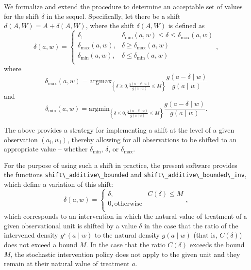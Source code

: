 \documentclass[
  12pt, krantz2,
]{krantz}
\newcommand{\passthrough}[1]{#1}
\theoremstyle{definition}
\theoremstyle{definition}
\theoremstyle{definition}
\newcommand{\1}{\mathbbm{1}}
\begin{document}
We formalize and extend the procedure to determine an acceptable set of values
for the shift \(\delta\) in the sequel. Specifically, let there be a shift \(d(A, W) = A + \delta(A, W)\), where the shift \(\delta(A, W)\) is defined as
\begin{equation}
  \delta(a, w) =
    \begin{cases}
      \delta, & \delta_{\text{min}}(a,w) \leq \delta \leq
        \delta_{\text{max}}(a,w) \\
      \delta_{\text{max}}(a,w), & \delta \geq \delta_{\text{max}}(a,w) \\
      \delta_{\text{min}}(a,w), & \delta \leq \delta_{\text{min}}(a,w) \\
    \end{cases},
\end{equation}
where \[\delta_{\text{max}}(a, w) = \text{argmax}_{\left\{\delta \geq 0,
\frac{g(a - \delta \mid w)}{g(a \mid w)} \leq M \right\}} \frac{g(a - \delta
\mid w)}{g(a \mid w)}\] and
\[\delta_{\text{min}}(a, w) = \text{argmin}_{\left\{\delta \leq 0,
\frac{g(a - \delta \mid w)}{g(a \mid w)} \leq M \right\}} \frac{g(a - \delta
\mid w)}{g(a \mid w)}.\]

The above provides a strategy for implementing a shift at the level of a given
observation \((a_i, w_i)\), thereby allowing for all observations to be shifted
to an appropriate value -- whether \(\delta_{\text{min}}\), \(\delta\), or
\(\delta_{\text{max}}\).

For the purpose of using such a shift in practice, the present software
provides the functions \passthrough{\lstinline!shift\_additive\_bounded!} and
\passthrough{\lstinline!shift\_additive\_bounded\_inv!}, which define a variation of this shift:
\begin{equation}
  \delta(a, w) =
    \begin{cases}
      \delta, & C(\delta) \leq M \\
      0, \text{otherwise} \\
    \end{cases},
  \label{eq:shift-simple}
\end{equation}
which corresponds to an intervention in which the natural value of treatment
of a given observational unit is shifted by a value \(\delta\) in the case that
the ratio of the intervened density \(g^{\star}(a \mid w)\) to the natural
density \(g(a \mid w)\) (that is, \(C(\delta)\)) does not exceed a bound \(M\). In
the case that the ratio \(C(\delta)\) exceeds the bound \(M\), the stochastic
intervention policy does not apply to the given unit and they remain at their
natural value of treatment \(a\).
\end{document}
